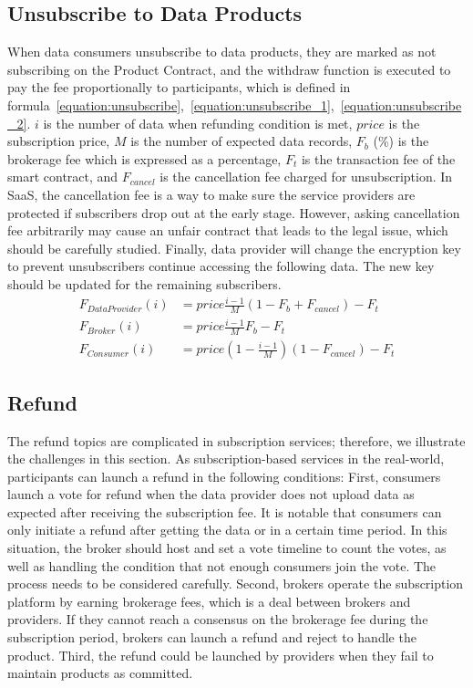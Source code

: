 \documentclass[10pt, conference, compsocconf]{IEEEtran}
\begin{document}
\subsection{Unsubscribe to Data Products}
When data consumers unsubscribe to data products, they are marked as not subscribing on the Product Contract, and the withdraw function is executed to pay the fee proportionally to participants, which is defined in formula~\ref{equation:unsubscribe},~\ref{equation:unsubscribe_1},~\ref{equation:unsubscribe_2}. $i$ is the number of data when refunding condition is met, $price$  is the subscription price, $M$ is the number of expected data records, $F_{b}$ (\%) is the brokerage fee which is expressed as a percentage, $F_{t}$ is the transaction fee of the smart contract, and $F_{cancel}$ is the cancellation fee charged for unsubscription. In SaaS, the cancellation fee is a way to make sure the service providers are protected if subscribers drop out at the early stage. However, asking cancellation fee arbitrarily may cause an unfair contract that leads to the legal issue, which should be carefully studied. Finally, data provider will change the encryption key to prevent unsubscribers continue accessing the following data. The new key should be updated for the remaining subscribers.
\begin{align}
    F_{DataProvider}(i) &= price \frac{i-1}{M} (1-F_{b}+F_{cancel}) -F_{t} \label{equation:unsubscribe} \\
    F_{Broker}(i) &= price \frac{i-1}{M} F_{b} -F_{t} \label{equation:unsubscribe_1} \\
    F_{Consumer}(i) &= price (1-\frac{i-1}{M})(1 -F_{cancel}) -F_{t} \label{equation:unsubscribe_2}
\end{align}
\subsection{Refund}
\label{section:refund}
The refund topics are complicated in subscription services; therefore, we illustrate the challenges in this section. As subscription-based services in the real-world, participants can launch a refund in the following conditions: First, consumers launch a vote for refund when the data provider does not upload data as expected after receiving the subscription fee. It is notable that consumers can only initiate a refund after getting the data or in a certain time period. In this situation, the broker should host and set a vote timeline to count the votes, as well as handling the condition that not enough consumers join the vote. The process needs to be considered carefully. Second, brokers operate the subscription platform by earning brokerage fees, which is a deal between brokers and providers. If they cannot reach a consensus on the brokerage fee during the subscription period, brokers can launch a refund and reject to handle the product. Third, the refund could be launched by providers when they fail to maintain products as committed.
\end{document}
